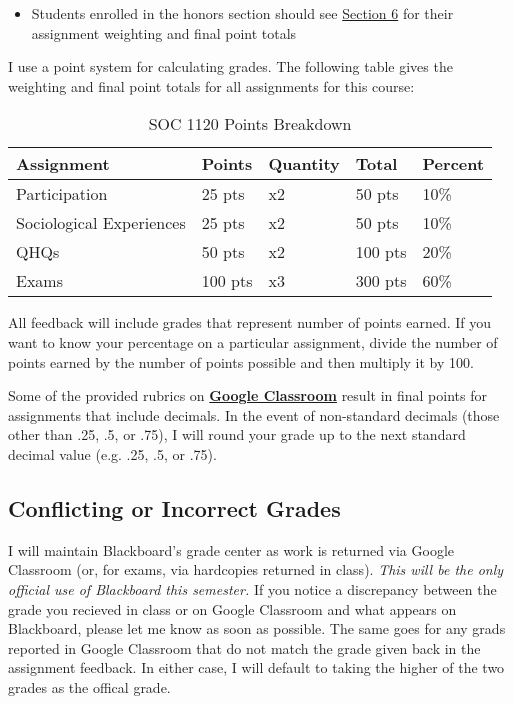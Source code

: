 \documentclass[]{book}
\newenvironment{rmdblock}[1]
  {\begin{shaded*}
  \begin{itemize}
  \renewcommand{\labelitemi}{
    \raisebox{-.7\height}[0pt][0pt]{
      {\setkeys{Gin}{width=3em,keepaspectratio}\texttt{[image: images/\#1]}}
    }
  }
  \item
  }
  {
  \end{itemize}
  \end{shaded*}
  }
\newenvironment{rmdwarning}
  {\begin{rmdblock}{warning}}
  {\end{rmdblock}}
\theoremstyle{definition}
\theoremstyle{definition}
\theoremstyle{definition}
\theoremstyle{remark}
\begin{document}
\begin{rmdwarning}
Students enrolled in the honors section should see
\href{/honors-overview.html}{Section 6} for their assignment weighting
and final point totals
\end{rmdwarning}

I use a point system for calculating grades. The following table gives
the weighting and final point totals for all assignments for this
course:

\begin{table}

\caption{\label{tab:unnamed-chunk-7}SOC 1120 Points Breakdown}
\centering
\begin{tabular}[t]{lllll}
\toprule
Assignment & Points & Quantity & Total & Percent\\
\midrule
Participation & 25 pts & x2 & 50 pts & 10\%\\
Sociological Experiences & 25 pts & x2 & 50 pts & 10\%\\
QHQs & 50 pts & x2 & 100 pts & 20\%\\
Exams & 100 pts & x3 & 300 pts & 60\%\\
\bottomrule
\end{tabular}
\end{table}

All feedback will include grades that represent number of points earned.
If you want to know your percentage on a particular assignment, divide
the number of points earned by the number of points possible and then
multiply it by 100.

Some of the provided rubrics on
\textbf{\href{https://classroom.google.com}{Google Classroom}} result in
final points for assignments that include decimals. In the event of
non-standard decimals (those other than .25, .5, or .75), I will round
your grade up to the next standard decimal value (e.g. .25, .5, or .75).

\hypertarget{conflicting-or-incorrect-grades}{%
\subsection{Conflicting or Incorrect
Grades}\label{conflicting-or-incorrect-grades}}

I will maintain Blackboard's grade center as work is returned via Google
Classroom (or, for exams, via hardcopies returned in class). \emph{This
will be the only official use of Blackboard this semester.} If you
notice a discrepancy between the grade you recieved in class or on
Google Classroom and what appears on Blackboard, please let me know as
soon as possible. The same goes for any grads reported in Google
Classroom that do not match the grade given back in the assignment
feedback. In either case, I will default to taking the higher of the two
grades as the offical grade.
\end{document}
